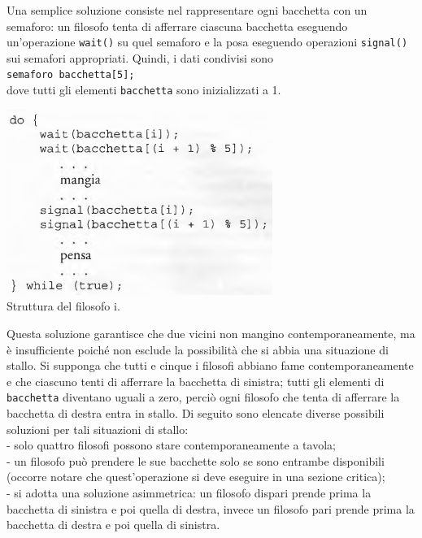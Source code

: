 \documentclass[11pt,a4paper]{article}
\begin{document}
Una semplice soluzione consiste nel rappresentare ogni bacchetta con un semaforo: un
filosofo tenta di afferrare ciascuna bacchetta eseguendo un'operazione \texttt{wait()} su quel semaforo e la posa eseguendo operazioni \texttt{signal()} sui semafori appropriati. Quindi, i dati
condivisi sono\medskip\\
\texttt{semaforo bacchetta[5];}\medskip\\
dove tutti gli elementi \texttt{bacchetta} sono inizializzati a 1.
\begin{center}
  \includegraphics[scale=0.6]{img/0031.png}\\
  \caption{Struttura del filosofo i.}
\end{center}
Questa soluzione garantisce che due vicini non mangino contemporaneamente, ma è
insufficiente poiché non esclude la possibilità che si abbia una situazione di stallo. Si sup­ponga che tutti e cinque i filosofi abbiano fame contemporaneamente e che ciascuno tenti
di afferrare la bacchetta di sinistra; tutti gli elementi di \texttt{bacchetta} diventano uguali a zero, perciò ogni filosofo che tenta di afferrare la bacchetta di destra entra in stallo. Di segui­to sono elencate diverse possibili soluzioni per tali situazioni di stallo:\\
- solo quattro filosofi possono stare contemporaneamente a tavola;\\
- un filosofo può prendere le sue bacchette solo se sono entrambe disponibili (occorre
notare che quest'operazione si deve eseguire in una sezione critica);\\
- si adotta una soluzione asimmetrica: un filosofo dispari prende prima la bacchetta di
sinistra e poi quella di destra, invece un filosofo pari prende prima la bacchetta di de­stra e poi quella di sinistra.
\end{document}
